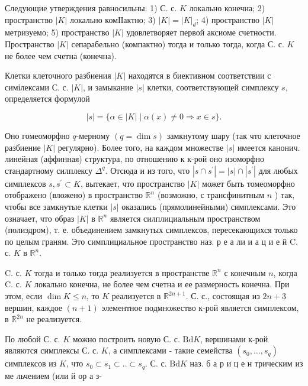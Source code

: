 \documentclass[10pt]{article}
\begin{document}
Следующие утверждения равносильны: 1) С. с. $K$ локально конечна; 2) пространство $|K|$ локально комІІактно; 3) $|K|=|K|_{d}$; 4) пространство $|K|$ метризуемо; 5) пространство $|K|$ удовлетворяет первой аксиоме счетности. Пространство $|K|$ сепарабельно (компактно) тогда и только тогда, когда С. с. $K$ не более чем счетна (конечна).



Клетки клеточного разбиения $|K|$ находятся в биективном соответствии с симілексами С. с. $|K|$, и замыкание $|s|$ клетки, соответствующей симплексу $s$, определяется формулой



\[

|s|=\{\alpha \in|K| \mid \alpha(x) \neq 0 \Rightarrow x \in s\} .

\]



Оно гомеоморфно $q$-мерному $(q=\operatorname{dim} s)$ замкнутому шару (так что клеточное разбиение $|K|$ регулярно). Более того, на каждом множестве $|s|$ имеется канонич. линейная (аффинная) структура, по отношению к к-рой оно изоморфно стандартному силплексу $\Delta^{q}$. Отсюда и из того, что $\left|s \cap s^{\prime}\right|=|s| \cap\left|s^{\prime}\right|$ для любых симплексов $s, s^{\prime} \subset K$, вытекает, что пространство $|K|$ может быть томеоморфно отображено (вложено) в пространство $\mathbb{R}^{n}$ (возможно, с трансфинитным $n$ ) так, чтобы все замкнутые клетки $|s|$ оказались (прямолинейными) симплексами. Это означает, что образ $|K|$ в $\mathbb{R}^{n}$ является силплициальным пространством (полиэдром), т. е. объединением замкнутых симплексов, пересекающихся только по целым граням. Это симплициальное пространство наз. р е а ли и а ц и е й C. с. $K$ в $\mathbb{R}^{n}$.



C. с. $K$ тогда и только тогда реализуется в пространстве $\mathbb{R}^{n}$ с конечным $n$, когда C. с. $K$ локально конечна, не более чем счетна и ее размерность конечна. При этом, если $\operatorname{dim} K \leqslant n$, то $K$ реализуется в $\mathbb{R}^{2 n+1}$. С. с., состоящая из $2 n+3$ вершин, каждое $(n+1)$ элементное подмножество к-рой является симплексом, в $\mathbb{R}^{2 n}$ не реализуется.



По любой С. с. $K$ можно построить новую С. с. $\mathrm{Bd} K$, вершинами к-рой являются симплексы С. с. $K$, а симплексами - такие семейства $\left(s_{0}, \ldots, s_{q}\right)$ симплексов из $K$, что $s_{0} \subset s_{1} \subset . . \subset s_{q}$. С. с. $\mathrm{Bd} K$ наз. б а р и ц е н трическим из ме льчением (или й ор а з-
\end{document}
